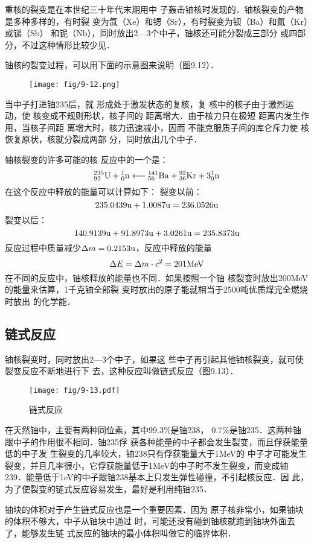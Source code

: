 重核的裂变是在本世纪三十年代末期用中
子轰击铀核时发现的．铀核裂变的产物是多种多样的，有时裂
变为氙（Xe）和锶（Sr），有时裂变为钡（Ba）和氮（Kr）或锑（Sb）
和铌（Nb），同时放出2—3个中子，铀核还可能分裂成三部分
或四部分，不过这种情形比较少见．

铀核的裂变过程，可以用下面的示意图来说明（图9.12）．
\begin{figure}[htp]\centering
\texttt{[image: fig/9-12.png]}
\caption{}
\end{figure}

当中子打进铀235后，就
形成处于激发状态的复核，复
核中的核子由于激烈运动，使
核变成不规则形状，核子间的
距离增大．由于核力只在极短
距离内发生作用，当核子间距
离增大时，核力迅速减小，因而
不能克服质子间的库仑斥力使
核恢复原状，核就分裂成两部
分，同时放出几个中子．

轴核裂变的许多可能的核
反应中的一个是：
\[\atom{U}{235}{92}+\atom{n}{1}{0}\longleftarrow \atom{Ba}{141}{56}+\atom{Kr}{92}{36}+3\atom{n}{1}{0}\]
在这个反应中释放的能量可以计算如下：
裂变以前：
\[235.0439{\rm u}+1.0087{\rm u}=236.0526{\rm u} \]
裂变以后：
\[140.9139{\rm u}+91.8973{\rm u}+3.0261{\rm u}=235.8373{\rm u} \]
反应过程中质量减少$\Delta m=0.2153{\rm u}$，反应中释放的能量
\[\Delta E=\Delta m\cdot c^2=201{\rm MeV}\]
在不同的反应中，铀核释放的能量也不同．如果按照一个铀
核裂变时放出200MeV的能量来估算，1千克铀全部裂
变时放出的原子能就相当于2500吨优质煤完全燃烧时放出
的化学能．

\subsection{链式反应} 

铀核裂变时，同时放出2—3个中子，如果这
些中子再引起其他铀核裂变，就可使裂变反应不断地进行下
去，这种反应叫做链式反应（图9.13）．

\begin{figure}[htp]
    \centering
    \texttt{[image: fig/9-13.pdf]}
    \caption{链式反应}
\end{figure}


在天然铀中，主要有两种同位素，其中99.3\%是铀238，
0.7\%是铀235．这两种铀跟中子的作用很不相同．铀235俘
获各种能量的中子都会发生裂变，而且俘获能量低的中子发
生裂变的几率较大，铀238只有俘获能量大于1MeV的
中子才可能发生裂变，并且几率很小，它俘获能量低于1MeV的中子时不发生裂变，而变成铀239．能量低于1eV的中子跟铀238基本上只发生弹性碰撞，不引起核反应．因
此，为了使裂变的链式反应容易发生，最好是利用纯铀235．

铀块的体积对于产生链式反应也是一个重要因素．因为
原子核非常小，如果铀块的体积不够大，中子从铀块中通过
时，可能还没有碰到铀核就跑到铀块外面去了，能够发生链
式反应的铀块的最小体积叫做它的临界体积．


